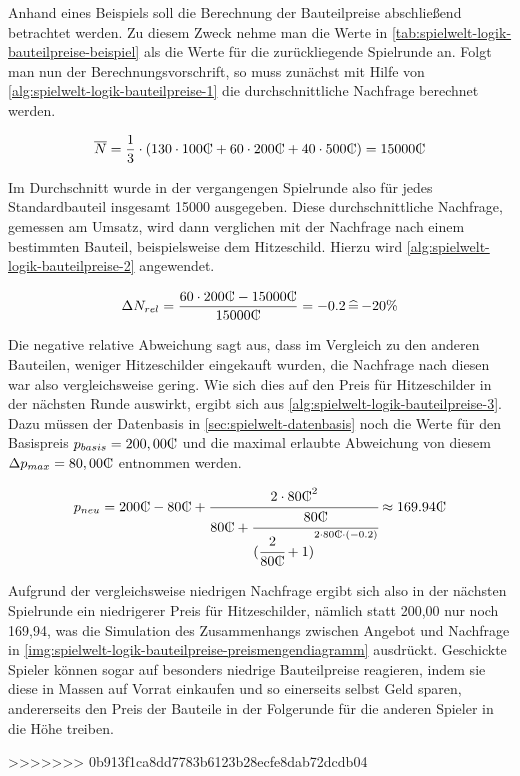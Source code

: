 Anhand eines Beispiels soll die Berechnung der Bauteilpreise abschließend betrachtet werden. Zu diesem Zweck nehme man die Werte in \ref{tab:spielwelt-logik-bauteilpreise-beispiel} als die Werte für die zurückliegende Spielrunde an. Folgt man nun der Berechnungsvorschrift, so muss zunächst mit Hilfe von \ref{alg:spielwelt-logik-bauteilpreise-1} die durchschnittliche Nachfrage berechnet werden.

\newcommand{\tc}{\text{\curr}}
\begin{equation}
     \overline{N} = \frac{1}{3} \cdot {(130 \cdot 100 \tc + 60 \cdot 200 \tc + 40 \cdot 500 \tc)} = 15000 \tc \nonumber
\end{equation}

Im Durchschnitt wurde in der vergangengen Spielrunde also für jedes Standardbauteil insgesamt 15000\curr{} ausgegeben. Diese durchschnittliche Nachfrage, gemessen am Umsatz, wird dann verglichen mit der Nachfrage nach einem bestimmten Bauteil, beispielsweise dem Hitzeschild. Hierzu wird \ref{alg:spielwelt-logik-bauteilpreise-2} angewendet.

\begin{equation}
     \Delta{}N_{rel} = \frac{60 \cdot 200 \tc - 15000 \tc}{15000 \tc} = -0.2 \mathop{\widehat{=}} -20\% \nonumber
\end{equation}

Die negative relative Abweichung sagt aus, dass im Vergleich zu den anderen Bauteilen, weniger Hitzeschilder eingekauft wurden, die Nachfrage nach diesen war also vergleichsweise gering. Wie sich dies auf den Preis für Hitzeschilder in der nächsten Runde auswirkt, ergibt sich aus \ref{alg:spielwelt-logik-bauteilpreise-3}. Dazu müssen der Datenbasis in \ref{sec:spielwelt-datenbasis} noch die Werte für den Basispreis $p_{basis} = 200,00\tc$ und die maximal erlaubte Abweichung von diesem $\Delta{}p_{max} = 80,00\tc$ entnommen werden.

\begin{large}
\begin{equation}
     p_{neu} = 200 \tc -80 \tc + \cfrac{2 \cdot 80 \tc^2}{80 \tc + \cfrac{80 \tc}{({\cfrac{2}{80 \tc} + 1)}^{2 \cdot 80 \tc \cdot (-0.2)}}} \approx 169.94 \tc \nonumber
\end{equation}
\end{large}

Aufgrund der vergleichsweise niedrigen Nachfrage ergibt sich also in der nächsten Spielrunde ein niedrigerer Preis für Hitzeschilder, nämlich statt 200,00\curr{} nur noch 169,94\curr{}, was die Simulation des Zusammenhangs zwischen Angebot und Nachfrage in \ref{img:spielwelt-logik-bauteilpreise-preismengendiagramm} ausdrückt. Geschickte Spieler können sogar auf besonders niedrige Bauteilpreise reagieren, indem sie diese in Massen auf Vorrat einkaufen und so einerseits selbst Geld sparen, andererseits den Preis der Bauteile in der Folgerunde für die anderen Spieler in die Höhe treiben.

\autorende{}
>>>>>>> 0b913f1ca8dd7783b6123b28ecfe8dab72dcdb04
